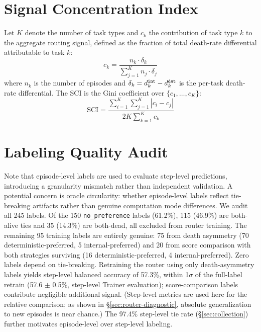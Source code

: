 \documentclass[11pt]{article}
\begin{document}
\section{Signal Concentration Index}
\label{app:sci}

Let $K$ denote the number of task types and $c_k$ the contribution of task type $k$ to the aggregate routing signal, defined as the fraction of total death-rate differential attributable to task $k$:
\begin{equation}
    c_k = \frac{n_k \cdot \delta_k}{\sum_{j=1}^{K} n_j \cdot \delta_j}
\end{equation}
where $n_k$ is the number of episodes and $\delta_k = d_k^{\tt int} - d_k^{\tt det}$ is the per-task death-rate differential. The SCI is the Gini coefficient over $\{c_1, \ldots, c_K\}$:
\begin{equation}
    \text{SCI} = \frac{\sum_{i=1}^K \sum_{j=1}^K |c_i - c_j|}{2K \sum_{k=1}^K c_k}
\end{equation}

\section{Labeling Quality Audit}
\label{app:labeling}

Note that episode-level labels are used to evaluate step-level predictions, introducing a granularity mismatch rather than independent validation. A potential concern is oracle circularity: whether episode-level labels reflect tie-breaking artifacts rather than genuine computation mode differences. We audit all 245 labels. Of the 150 \texttt{no\_preference} labels (61.2\%), 115 (46.9\%) are both-alive ties and 35 (14.3\%) are both-dead, all excluded from router training. The remaining 95 training labels are entirely genuine: 75 from death asymmetry (70 deterministic-preferred, 5 internal-preferred) and 20 from score comparison with both strategies surviving (16 deterministic-preferred, 4 internal-preferred). Zero labels depend on tie-breaking. Retraining the router using only death-asymmetry labels yields step-level balanced accuracy of 57.3\%, within 1$\sigma$ of the full-label retrain (57.6 $\pm$ 0.5\%, step-level Trainer evaluation); score-comparison labels contribute negligible additional signal. (Step-level metrics are used here for the relative comparison; as shown in \S\ref{sec:router-diagnostic}, absolute generalization to new episodes is near chance.) The 97.4\% step-level tie rate (\S\ref{sec:collection}) further motivates episode-level over step-level labeling.
\end{document}
